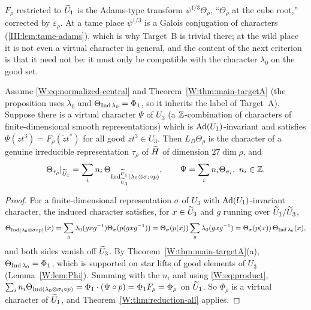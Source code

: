 \begin{remark}
$F_\rho$ restricted to $\widetilde U_1$ is the Adams-type transform
$\psi^{1/3}\Theta_\rho$, ``$\Theta_\rho$ at the cube root,'' corrected by
$\varepsilon_\rho$.  At a tame place $\psi^{1/3}$ is a Galois conjugation
of characters (\cref{III:lem:tame-adams}), which is why Target~B is trivial
there; at the wild place it is not even a virtual character in general,
and the content of the next criterion is that it need not be: it must
only be compatible with the character $\lambda_0$ on the good set.
\end{remark}

\begin{proposition}\label{W:prop:criterion}
Assume \eqref{W:eq:normalized-central} and Theorem~\ref{W:thm:main-targetA}
(the proposition uses $\lambda_0$ and $\Theta_{\operatorname{Ind}\lambda_0}=\Phi_1$, so
it inherits the label of Target~A).  Suppose there is a virtual
character $\Psi$ of $U_3$ (a $\mathbb Z$-combination of characters of
finite-dimensional smooth representations) which is $\operatorname{Ad}(U_1)$-invariant
and satisfies $\Psi(zt^3)=F_\rho(\tilde zt^*)$ for all good $zt^3\in U_3$.
Then $L_D\Theta_\rho$ is the character of a genuine irreducible
representation $\tau_\rho$ of $\widetilde H$ of dimension $27\dim\rho$, and
\begin{equation}\label{W:eq:tau-rho}
 \Theta_{\tau_\rho}|_{\widetilde U_1}=\sum_i n_i\,\Theta_{\operatorname{Ind}_{\widetilde U_3}^{\widetilde U_1}(\lambda_0\otimes\sigma_i\circ p)},
 \qquad \Psi=\sum_i n_i\Theta_{\sigma_i},\ n_i\in\mathbb Z .
\end{equation}
\end{proposition}
\begin{proof}
For a finite-dimensional representation $\sigma$ of $U_3$ with
$\operatorname{Ad}(U_1)$-invariant character, the induced character satisfies, for
$x\in\widetilde U_3$ and $g$ running over $\widetilde U_1/\widetilde U_3$,
\[
 \Theta_{\operatorname{Ind}(\lambda_0\otimes\sigma\circ p)}(x)=\sum_g\lambda_0(gxg^{-1})\Theta_\sigma(p(gxg^{-1}))
 =\Theta_\sigma(p(x))\sum_g\lambda_0(gxg^{-1})=\Theta_\sigma(p(x))\,\Theta_{\operatorname{Ind}\lambda_0}(x),
\]
and both sides vanish off $\widetilde U_3$.  By Theorem~\ref{W:thm:main-targetA}(a),
$\Theta_{\operatorname{Ind}\lambda_0}=\Phi_1$, which is supported on star lifts of good
elements of $U_3$ (Lemma~\ref{W:lem:Phi}).  Summing with the $n_i$ and
using \eqref{W:eq:product}, $\sum_in_i\Theta_{\operatorname{Ind}(\lambda_0\otimes\sigma_i\circ p)}=\Phi_1\cdot(\Psi\circ p)=\Phi_1F_\rho=\Phi_\rho$
on $\widetilde U_1$.  So $\Phi_\rho$ is a virtual character of $\widetilde U_1$, and
Theorem~\ref{W:thm:reduction-all} applies.
\end{proof}


